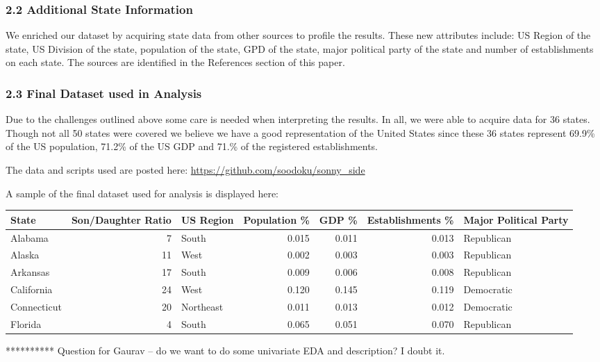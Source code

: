 \documentclass[]{article}
\begin{document}
\hypertarget{additional-state-information}{%
\subsubsection{2.2 Additional State
Information}\label{additional-state-information}}

We enriched our dataset by acquiring state data from other sources to
profile the results. These new attributes include: US Region of the
state, US Division of the state, population of the state, GPD of the
state, major political party of the state and number of establishments
on each state. The sources are identified in the References section of
this paper.

\hypertarget{final-dataset-used-in-analysis}{%
\subsubsection{2.3 Final Dataset used in
Analysis}\label{final-dataset-used-in-analysis}}

Due to the challenges outlined above some care is needed when
interpreting the results. In all, we were able to acquire data for 36
states. Though not all 50 states were covered we believe we have a good
representation of the United States since these 36 states represent
69.9\% of the US population, 71.2\% of the US GDP and 71.\% of the
registered establishments.

The data and scripts used are posted here:
\url{https://github.com/soodoku/sonny_side}

A sample of the final dataset used for analysis is displayed here:

\begin{longtable}[]{@{}lrlrrrl@{}}
\toprule
State & Son/Daughter Ratio & US Region & Population \% & GDP \% &
Establishments \% & Major Political Party\tabularnewline
\midrule
\endhead
Alabama & 7 & South & 0.015 & 0.011 & 0.013 & Republican\tabularnewline
Alaska & 11 & West & 0.002 & 0.003 & 0.003 & Republican\tabularnewline
Arkansas & 17 & South & 0.009 & 0.006 & 0.008 &
Republican\tabularnewline
California & 24 & West & 0.120 & 0.145 & 0.119 &
Democratic\tabularnewline
Connecticut & 20 & Northeast & 0.011 & 0.013 & 0.012 &
Democratic\tabularnewline
Florida & 4 & South & 0.065 & 0.051 & 0.070 & Republican\tabularnewline
\bottomrule
\end{longtable}

********** Question for Gaurav -- do we want to do some univariate EDA
and description? I doubt it.
\end{document}
